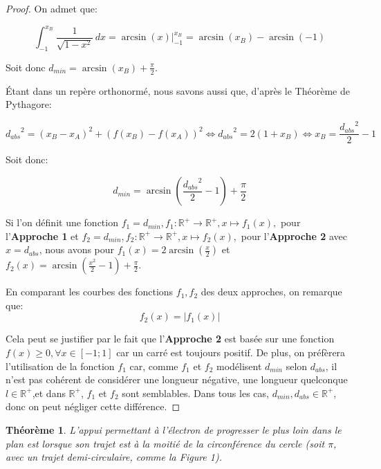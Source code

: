\documentclass{amsart}
\newtheorem{theorem}{Théorème}[section]
\theoremstyle{definition}
\theoremstyle{remark}
\numberwithin{equation}{section}
\begin{document}
\begin{proof}
  On admet que:

  \[\int_{-1}^{x_B} \frac{1}{\sqrt{1-x^2}}\,dx=\arcsin (x)\Biggr|_{-1}^{x_B}=\arcsin (x_B)-\arcsin (-1)\]

  Soit donc $d_{min}=\arcsin (x_B)+\frac{\pi}{2}$.

  Étant dans un repère orthonormé, nous savons aussi que, d'après le Théorème de Pythagore:

  \[{d_{abs}}^2=(x_B-x_A)^2+(f(x_B)-f(x_A))^2 \Leftrightarrow {d_{abs}}^2=2(1+x_B) \Leftrightarrow x_B=\frac{{d_{abs}}^2}{2}-1\]

  Soit donc:

  \[d_{min}=\arcsin (\frac{{d_{abs}}^2}{2}-1)+\frac{\pi}{2}\]

  Si l'on définit une fonction $f_1=d_{min}, f_1:\mathbb{R^+}\longrightarrow \mathbb{R^+}, x\longmapsto f_1(x),$ pour l'\textbf{Approche 1} et $f_2=d_{min}, f_2:\mathbb{R^+}\longrightarrow \mathbb{R^+}, x\longmapsto f_2(x),$ pour l'\textbf{Approche 2} avec $x=d_{abs}$, nous avons pour $f_1(x)=2\arcsin (\frac{x}{2})$ et $f_2(x)=\arcsin (\frac{x^2}{2}-1)+\frac{\pi}{2}$.

  En comparant les courbes des fonctions $f_1,f_2$ des deux approches, on remarque que: \[f_2(x)=\lvert f_1(x) \rvert\]

  Cela peut se justifier par le fait que l'\textbf{Approche 2} est basée sur une fonction $f(x)\geq0, \forall x\in[-1;1]$ car un carré est toujours positif. De plus, on préfèrera l'utilisation de la fonction $f_1$ car, comme $f_1$ et $f_2$
  modélisent $d_{min}$ selon $d_{abs}$, il n'est pas cohérent de considérer une longueur négative, une longueur quelconque $l\in\mathbb{R^+}$,et dans $\mathbb{R^+}$, $f_1$ et $f_2$ sont semblables. Dans tous les cas, $d_{min},d_{abs}\in\mathbb{R^+}$, donc on peut négliger cette différence.
\end{proof}

\begin{theorem}
  L'appui permettant à l'électron de progresser le plus loin dans le plan est lorsque son trajet est à la moitié de la circonférence du cercle (soit $\pi$, avec un trajet demi-circulaire, comme la Figure 1).
\end{theorem}
\end{document}
